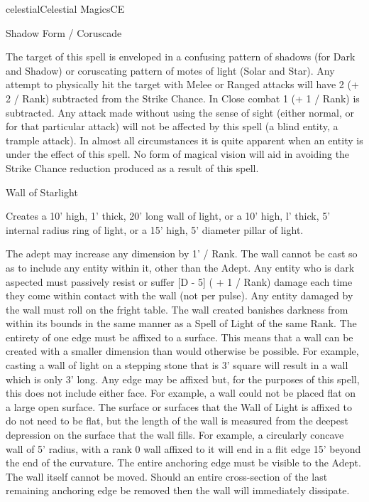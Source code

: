 \begin{college}[1.3]{celestial}{Celestial Magics}{CE}
\begin{spell}[G-4]{Shadow Form / Coruscade}

\begin{effects}
The target of this spell is enveloped in a confusing pattern of
shadows (for Dark and Shadow) or coruscating pattern of motes of light
(Solar and Star).  Any attempt to physically hit the target with Melee
or Ranged attacks will have 2 (+ 2 / Rank) subtracted from the Strike
Chance.  In Close combat 1 (+ 1 / Rank) is subtracted.  Any attack
made without using the sense of sight (either normal, or for that
particular attack) will not be affected by this spell (\eg a blind
entity, a trample attack).  In almost all circumstances it is quite
apparent when an entity is under the effect of this spell.  No form of
magical vision will aid in avoiding the Strike Chance reduction
produced as a result of this spell.
\end{effects}
\end{spell}

\begin{spell}[G-5]{Wall of Starlight}

\begin{effects}
Creates a 10' high, 1' thick, 20' long wall of light, or a 10' high,
l' thick, 5' internal radius ring of light, or a 15' high, 5' diameter
pillar of light.

The adept may increase any dimension by 1' / Rank.  The wall cannot
be cast so as to include any entity within it, other than the Adept.
Any entity who is dark aspected must passively resist or suffer [D -
5] ( + 1 / Rank) damage each time they come within contact with the
wall (not per pulse).  Any entity damaged by the wall must roll on the
fright table.  The wall created banishes darkness from within its
bounds in the same manner as a Spell of Light of the same Rank.  The
entirety of one edge must be affixed to a surface.  This means that a
wall can be created with a smaller dimension than would otherwise be
possible.  For example, casting a wall of light on a stepping stone
that is 3' square will result in a wall which is only 3' long.  Any
edge may be affixed but, for the purposes of this spell, this does
not include either face.  For example, a wall could not be placed
flat on a large open surface. The surface or surfaces that the Wall
of Light is affixed to do not need to be flat, but the length of the
wall is measured from the deepest depression on the surface that the
wall fills.  For example, a circularly concave wall of 5' radius,
with a rank 0 wall affixed to it will end in a flit edge 15' beyond
the end of the curvature.  The entire anchoring edge must be visible
to the Adept.  The wall itself cannot be moved.  Should an entire
cross-section of the last remaining anchoring edge be removed then the
wall will immediately dissipate.


\end{effects}
\end{spell}
\end{college}
